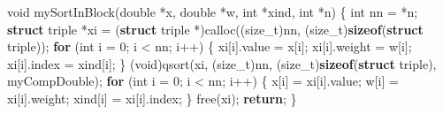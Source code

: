 \documentclass[
  12pt,
  letterpaper,
  DIV=11,
  numbers=noendperiod]{scrreprt}
\newenvironment{Shaded}{\begin{snugshade}}{\end{snugshade}}
\newcommand{\ControlFlowTok}[1]{\textcolor[rgb]{0.00,0.23,0.31}{\textbf{#1}}}
\newcommand{\DataTypeTok}[1]{\textcolor[rgb]{0.68,0.00,0.00}{#1}}
\newcommand{\DecValTok}[1]{\textcolor[rgb]{0.68,0.00,0.00}{#1}}
\newcommand{\KeywordTok}[1]{\textcolor[rgb]{0.00,0.23,0.31}{\textbf{#1}}}
\newcommand{\NormalTok}[1]{\textcolor[rgb]{0.00,0.23,0.31}{#1}}
\newcommand{\OperatorTok}[1]{\textcolor[rgb]{0.37,0.37,0.37}{#1}}
\theoremstyle{remark}
\begin{document}
\begin{Shaded}
\begin{Highlighting}[]
\DataTypeTok{void}\NormalTok{ mySortInBlock}\OperatorTok{(}\DataTypeTok{double} \OperatorTok{*}\NormalTok{x}\OperatorTok{,} \DataTypeTok{double} \OperatorTok{*}\NormalTok{w}\OperatorTok{,} \DataTypeTok{int} \OperatorTok{*}\NormalTok{xind}\OperatorTok{,} \DataTypeTok{int} \OperatorTok{*}\NormalTok{n}\OperatorTok{)} \OperatorTok{\{}
    \DataTypeTok{int}\NormalTok{ nn }\OperatorTok{=} \OperatorTok{*}\NormalTok{n}\OperatorTok{;}
    \KeywordTok{struct}\NormalTok{ triple }\OperatorTok{*}\NormalTok{xi }\OperatorTok{=}
        \OperatorTok{(}\KeywordTok{struct}\NormalTok{ triple }\OperatorTok{*)}\NormalTok{calloc}\OperatorTok{((}\DataTypeTok{size\_t}\OperatorTok{)}\NormalTok{nn}\OperatorTok{,} \OperatorTok{(}\DataTypeTok{size\_t}\OperatorTok{)}\KeywordTok{sizeof}\OperatorTok{(}\KeywordTok{struct}\NormalTok{ triple}\OperatorTok{));}
    \ControlFlowTok{for} \OperatorTok{(}\DataTypeTok{int}\NormalTok{ i }\OperatorTok{=} \DecValTok{0}\OperatorTok{;}\NormalTok{ i }\OperatorTok{\textless{}}\NormalTok{ nn}\OperatorTok{;}\NormalTok{ i}\OperatorTok{++)} \OperatorTok{\{}
\NormalTok{        xi}\OperatorTok{[}\NormalTok{i}\OperatorTok{].}\NormalTok{value }\OperatorTok{=}\NormalTok{ x}\OperatorTok{[}\NormalTok{i}\OperatorTok{];}
\NormalTok{        xi}\OperatorTok{[}\NormalTok{i}\OperatorTok{].}\NormalTok{weight }\OperatorTok{=}\NormalTok{ w}\OperatorTok{[}\NormalTok{i}\OperatorTok{];}
\NormalTok{        xi}\OperatorTok{[}\NormalTok{i}\OperatorTok{].}\NormalTok{index }\OperatorTok{=}\NormalTok{ xind}\OperatorTok{[}\NormalTok{i}\OperatorTok{];}
    \OperatorTok{\}}
    \OperatorTok{(}\DataTypeTok{void}\OperatorTok{)}\NormalTok{qsort}\OperatorTok{(}\NormalTok{xi}\OperatorTok{,} \OperatorTok{(}\DataTypeTok{size\_t}\OperatorTok{)}\NormalTok{nn}\OperatorTok{,} \OperatorTok{(}\DataTypeTok{size\_t}\OperatorTok{)}\KeywordTok{sizeof}\OperatorTok{(}\KeywordTok{struct}\NormalTok{ triple}\OperatorTok{),}\NormalTok{ myCompDouble}\OperatorTok{);}
    \ControlFlowTok{for} \OperatorTok{(}\DataTypeTok{int}\NormalTok{ i }\OperatorTok{=} \DecValTok{0}\OperatorTok{;}\NormalTok{ i }\OperatorTok{\textless{}}\NormalTok{ nn}\OperatorTok{;}\NormalTok{ i}\OperatorTok{++)} \OperatorTok{\{}
\NormalTok{        x}\OperatorTok{[}\NormalTok{i}\OperatorTok{]} \OperatorTok{=}\NormalTok{ xi}\OperatorTok{[}\NormalTok{i}\OperatorTok{].}\NormalTok{value}\OperatorTok{;}
\NormalTok{        w}\OperatorTok{[}\NormalTok{i}\OperatorTok{]} \OperatorTok{=}\NormalTok{ xi}\OperatorTok{[}\NormalTok{i}\OperatorTok{].}\NormalTok{weight}\OperatorTok{;}
\NormalTok{        xind}\OperatorTok{[}\NormalTok{i}\OperatorTok{]} \OperatorTok{=}\NormalTok{ xi}\OperatorTok{[}\NormalTok{i}\OperatorTok{].}\NormalTok{index}\OperatorTok{;}
    \OperatorTok{\}}
\NormalTok{    free}\OperatorTok{(}\NormalTok{xi}\OperatorTok{);}
    \ControlFlowTok{return}\OperatorTok{;}
\OperatorTok{\}}


\end{Highlighting}
\end{Shaded}
\end{document}
